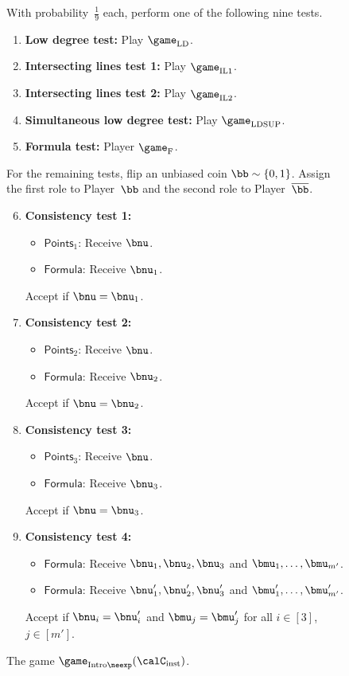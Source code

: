 {
\begin{figure}
With probability~$\tfrac{1}{9}$ each, perform one of the following nine tests.
\begin{enumerate}
	\item \textbf{Low degree test:} Play $\game_{\mathrm{LD}}$.
	\item \textbf{Intersecting lines test 1:} Play $\game_{\mathrm{IL1}}$.
	\item \textbf{Intersecting lines test 2:} Play $\game_{\mathrm{IL2}}$.
	\item \textbf{Simultaneous low degree test:} Play $\game_{\mathrm{LDSUP}}$.
	\item \textbf{Formula test:} Player $\game_{\mathrm{F}}$.
\end{enumerate}
For the remaining tests, flip an unbiased coin $\bb \sim \{0, 1\}$.
Assign the first role to Player~$\bb$ and the second role to Player~$\overline{\bb}$.
\begin{enumerate}
\setcounter{enumi}{5}
	\item \textbf{Consistency test 1:} 
		\begin{itemize}
		\item[$\circ$] $\mathsf{Points}_1$: Receive $\bnu$.
		\item[$\circ$] $\mathsf{Formula}$: Receive $\bnu_1$.
		\end{itemize}
		Accept if $\bnu = \bnu_1$.
	\item \textbf{Consistency test 2:} 
		\begin{itemize}
		\item[$\circ$] $\mathsf{Points}_2$: Receive $\bnu$.
		\item[$\circ$] $\mathsf{Formula}$: Receive $\bnu_2$.
		\end{itemize}
		Accept if $\bnu = \bnu_2$.
	\item \textbf{Consistency test 3:} 
		\begin{itemize}
		\item[$\circ$] $\mathsf{Points}_3$: Receive $\bnu$.
		\item[$\circ$] $\mathsf{Formula}$: Receive $\bnu_3$.
		\end{itemize}
		Accept if $\bnu = \bnu_3$.
	\item \textbf{Consistency test 4:} 
		\begin{itemize}
		\item[$\circ$] $\mathsf{Formula}$: Receive $\bnu_1, \bnu_2, \bnu_3$ and $\bmu_1, \ldots, \bmu_{m'}$.
		\item[$\circ$] $\mathsf{Formula}$: Receive $\bnu_1', \bnu_2', \bnu_3'$ and $\bmu_1', \ldots, \bmu_{m'}'$.
		\end{itemize}
		Accept if $\bnu_i = \bnu_i'$ and $\bmu_j = \bmu_j'$ for all $i \in [3]$, $j \in [m']$.
	\end{enumerate}
	\caption{The game $\game_{\mathrm{Intro}\neexp}(\calC_{\mathrm{inst}})$.\label{fig:big-neexp}}
\end{figure}
}

